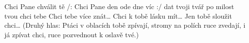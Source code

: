 \begin{TEXT}{Chci Pane chválit tě}
\REFREN    /: Chci Pane  den ode dne víc :/ \NL
{}dat tvoji tvář po milost tvou \NL
chci tebe  
\SLOKA Chci tebe více znát… 
\SLOKA Chci     k tobě lásku mít… 
\SLOKA Jen tobě sloužit chci…
\SLOKA[] (Druhý hlas: Ptáci v oblacích tobě zpívají, \NL
stromy na polích ruce zvedají, \NL
i já zpívat chci, ruce pozvednout k oslavě tvé.) \NL
\end{TEXT}
